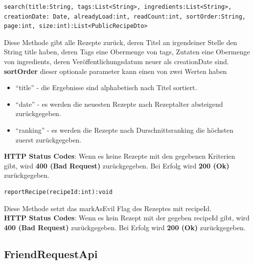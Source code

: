  \begin{lstlisting}
search(title:String, tags:List<String>, ingredients:List<String>,
creationDate: Date, alreadyLoad:int, readCount:int, sortOrder:String, page:int, size:int):List<PublicRecipeDto>
\end{lstlisting}
Diese Methode gibt alle Rezepte zurück, deren Titel an irgendeiner Stelle den String title haben, deren Tags eine Obermenge von tags, Zutaten eine Obermenge von ingredients, deren Veröffentlichungsdatum neuer als creationDate sind.\\

\textbf{sortOrder}
dieser optionale parameter kann einen von zwei Werten haben
\begin{itemize}
\item "`title"' - die Ergebnisse sind alphabetisch nach Titel sortiert.
\item "`date"' - es werden die neuesten Rezepte nach Rezeptalter absteigend zurückgegeben.
\item "`ranking"' - es werden die Rezepte nach Durschnittsranking die höchsten zuerst zurückgegeben. 
\end{itemize}

\textbf{HTTP Status Codes}:
Wenn es keine Rezepte mit den gegebenen Kriterien gibt, wird \textbf{400 (Bad Request)} zurückgegeben. Bei Erfolg wird \textbf{200 (Ok)} zurückgegeben.
\vspace{1cm}  

 \begin{lstlisting}
reportRecipe(recipeId:int):void
\end{lstlisting}
Diese Methode setzt das markAsEvil Flag des Rezeptes mit recipeId.\\
\textbf{HTTP Status Codes}:
Wenn es kein Rezept mit der gegeben recipeId gibt, wird \textbf{400 (Bad Request)} zurückgegeben. Bei Erfolg wird \textbf{200 (Ok)} zurückgegeben.
\subsection{FriendRequestApi}

